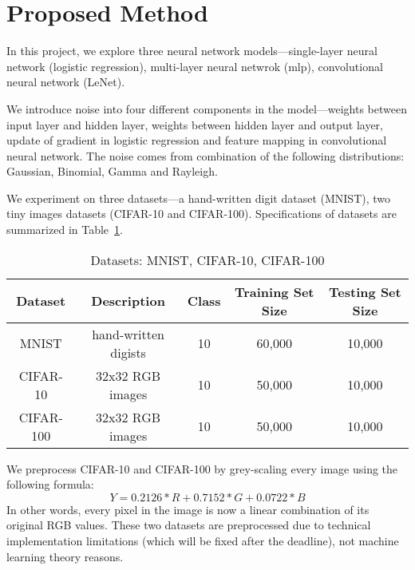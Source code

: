 \section{Proposed Method}
\label{sec:method}


In this project, we explore three neural network models---single-layer
neural network (logistic regression), multi-layer neural netwrok (mlp),
convolutional neural network (LeNet).

We introduce noise into four different components in the model---weights
between input layer and hidden layer, weights between hidden layer and
output layer, update of gradient in logistic regression and feature
mapping in convolutional neural network.
The noise comes from combination of the following distributions: Gaussian,
Binomial, Gamma and Rayleigh.

We experiment on three datasets---a hand-written digit dataset (MNIST),
two tiny images datasets (CIFAR-10 and CIFAR-100).
Specifications of datasets are summarized in Table~\ref{datasets}.
\vspace{-7pt}
\begin{table}[!htbp]
\centering
\caption{Datasets: MNIST, CIFAR-10, CIFAR-100}
\label{datasets}
\begin{tabular}{| c | c | c | c | c |}
\hline
Dataset & Description & Class & Training Set Size & Testing Set Size \\
\hline
MNIST & hand-written digists & 10 & 60,000 & 10,000\\
CIFAR-10 & 32x32 RGB images & 10 & 50,000 & 10,000\\
CIFAR-100 & 32x32 RGB images & 10 & 50,000 & 10,000\\
\hline
\end{tabular}
\end{table}

We preprocess CIFAR-10 and CIFAR-100 by grey-scaling every image using the following formula:
\[
Y = 0.2126 * R + 0.7152 * G + 0.0722 * B
\]
In other words, every pixel in the image is now a linear combination of its
original RGB values. These two datasets are preprocessed due to technical
implementation limitations (which will be fixed after the deadline), not
machine learning theory reasons.

